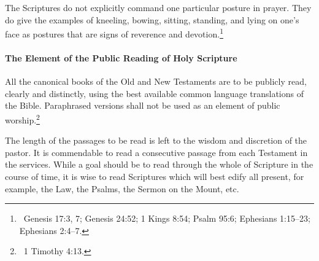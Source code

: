 \begin{outerlst}[left=0pt,labelsep=0pt]
\begin{innerlst}[resume*]
      \item The Scriptures do not explicitly command one particular posture in prayer. They do give the examples of kneeling, bowing, sitting, standing, and lying on one's face as postures that are signs of reverence and devotion.\footnote{\ Genesis 17:3, 7; Genesis 24:52; 1 Kings 8:54; Psalm 95:6; Ephesians 1:15--23; Ephesians 2:4--7.} 
\end{innerlst} 

\paragraph[The Element of the Public Reading of Holy Scripture]{The Element of the Public Reading of Holy Scripture}  

\begin{innerlst}[resume*]
      \item All the canonical books of the Old and New Testaments are to be publicly read, clearly and distinctly, using the best available common language translations of the Bible. Paraphrased versions shall not be used as an element of public worship.\footnote{\ 1 Timothy 4:13.} 
      \item The length of the passages to be read is left to the wisdom and discretion of the pastor. It is commendable to read a consecutive passage from each Testament in the services. While a goal should be to read through the whole of Scripture in the course of time, it is wise to read Scriptures which will best edify all present, for example, the Law, the Psalms, the Sermon on the Mount, etc. 
\end{innerlst} 


\end{outerlst}

